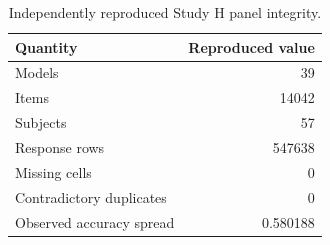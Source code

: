 \begin{table}[t]
\centering
\caption{Independently reproduced Study H panel integrity.}
\begin{tabular}{lr}
\toprule
Quantity & Reproduced value \\
\midrule
Models & 39 \\
Items & 14042 \\
Subjects & 57 \\
Response rows & 547638 \\
Missing cells & 0 \\
Contradictory duplicates & 0 \\
Observed accuracy spread & 0.580188 \\
\bottomrule
\end{tabular}
\end{table}
